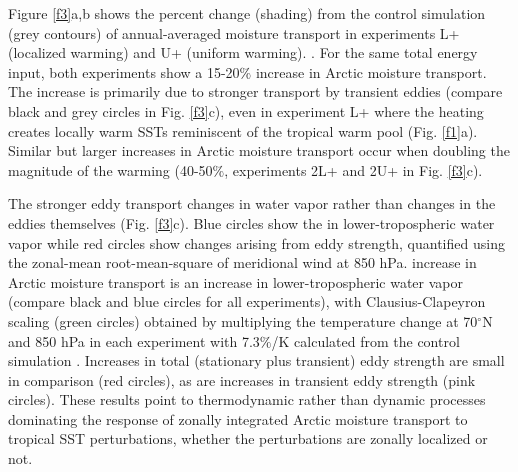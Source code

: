 \documentclass[draft]{agujournal2019}
\begin{document}
 Figure \ref{f3}a,b shows the percent change (shading) from the control simulation (grey contours) of annual-averaged moisture transport in experiments L+ (localized warming) and U+ (uniform warming). . For the same total energy input, both experiments show a 15-20$\%$ increase in Arctic moisture transport. The increase is primarily due to stronger transport by transient eddies (compare black and grey circles in Fig. \ref{f3}c), even in experiment L+ where the heating creates locally warm SSTs reminiscent of the tropical warm pool (Fig. \ref{f1}a). Similar but larger increases in Arctic moisture transport occur when doubling the magnitude of the warming (40-50$\%$, experiments 2L+ and 2U+ in Fig. \ref{f3}c). 





The stronger eddy transport  changes in water vapor rather than changes in the eddies themselves (Fig. \ref{f3}c). Blue circles show the  in lower-tropospheric water vapor while red circles show changes arising from eddy strength, quantified using the zonal-mean root-mean-square of meridional wind at 850 hPa.  increase in Arctic moisture transport is  an increase in lower-tropospheric water vapor (compare black and blue circles for all experiments),  with Clausius-Clapeyron scaling (green circles) obtained by multiplying the temperature change at 70$^{\circ}$N and 850 hPa in each experiment with 7.3$\%$/K calculated from the control simulation \cite<equations 1 and 2 in>{HeldSoden2006}. Increases in total (stationary plus transient) eddy strength are small in comparison (red circles), as are increases in transient eddy strength (pink circles). These results point to thermodynamic rather than dynamic processes dominating the response of zonally integrated Arctic moisture transport to tropical SST perturbations, whether the perturbations are zonally localized or not.
\end{document}
